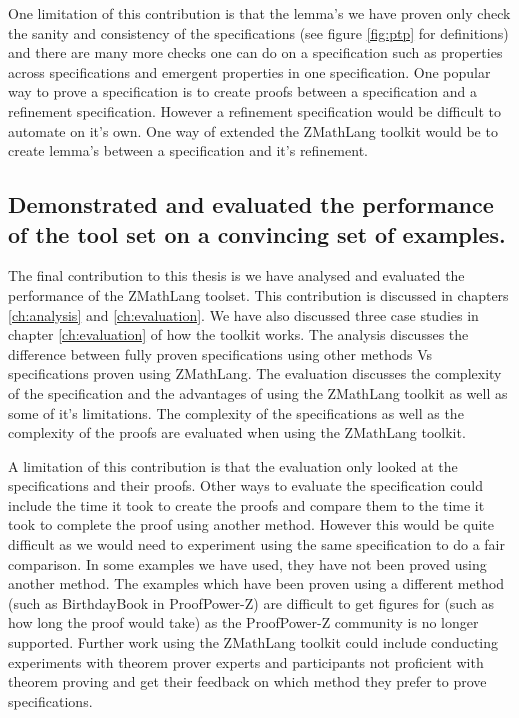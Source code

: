One limitation of this contribution is that the lemma's we have proven
only check the sanity and consistency of the specifications (see figure
\ref{fig:ptp} for definitions) and there are many more checks one can do on a
specification such as properties across specifications and emergent properties
in one specification. One popular way to prove a specification is to create proofs
between a specification and a refinement specification. However a refinement
specification would be difficult to automate on it's own. One way of extended
the ZMathLang toolkit would be to create lemma's between a specification and
it's refinement.

\subsection{Demonstrated and evaluated the performance of the tool set on a convincing
 set of examples.}

 The final contribution to this thesis is we have analysed and evaluated the
 performance of the ZMathLang toolset. This contribution is discussed in
 chapters \ref{ch:analysis} and \ref{ch:evaluation}. We have also discussed
 three case studies in chapter \ref{ch:evaluation} of how the toolkit works. The
 analysis discusses the difference between fully proven specifications using
 other methods Vs specifications proven using ZMathLang. The evaluation discusses
 the complexity of the specification and the advantages of using the ZMathLang
 toolkit as well as some of it's limitations. The complexity of the
 specifications as well as the complexity of the proofs are evaluated when using
the ZMathLang toolkit.

A limitation of this contribution is that the evaluation only looked at the
specifications and their proofs. Other ways to evaluate the specification could
include the time it took to create the proofs and compare them to the time it
took to complete the proof using another method. However this would be quite
difficult as we would need to experiment using the same specification to do a
fair comparison. In some examples we have used, they have not been proved using
another method. The examples which have been proven using a different method
(such as BirthdayBook in ProofPower-Z) are difficult to get figures for (such as
how long the proof would take) as the ProofPower-Z community is no longer
supported.
Further work using the ZMathLang toolkit could include conducting experiments
with theorem prover experts and participants not proficient with theorem proving
and get their feedback on which method they prefer to prove specifications.

